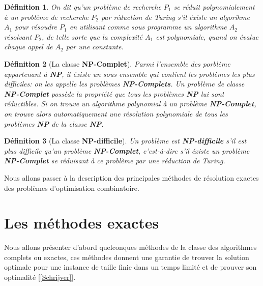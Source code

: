 \documentclass[a4paper,11pt,oneside]{report}
\theoremstyle{plain}
\newtheorem{definition}{D\'efinition}[section]
\newcommand{\0}{/ \! \! \! 0}
\theoremstyle{plain}
\begin{document}
\begin{definition}
 On dit qu'un probl\`eme de recherche $P_1$ se r\'eduit polynomialement \`a un probl\`eme de recherche $P_2$ par r\'eduction de Turing s'il \'existe
  un algorihme $A_1$ pour r\'esoudre $P_1$ en utilisant comme sous programme un algorithme $A_2$ r\'esolvant $P_2$, de telle sorte que la complexit\'e
  $A_1$ est polynomiale, quand on \'evalue chaque appel de $A_2$ par une constante.
\end{definition}
\begin{definition}[La classe {\bf NP-Complet}]
 Parmi l'ensemble des porbl\`eme appartenant \`a {\bf NP}, il \'existe un sous ensemble qui contient les probl\`emes les plus difficiles: 
 on les appelle les probl\`emes {\bf NP-Complets}. Un probl\`eme de classe {\bf NP-Complet} poss\`ede la propri\'et\'e que tous les probl\`emes {\bf NP} lui
 sont r\'eductibles. Si on trouve un algorithme polynomial \`a un probl\`eme {\bf NP-Complet}, on trouve alors automatiquement une r\'esolution polynomiale
  de tous les probl\`emes {\bf NP} de la classe {\bf NP}.
\end{definition}
\begin{definition}[La classe {\bf NP-difficile}]
 Un probl\`eme est {\bf NP-difficile} s'il est plus difficile qu'un probl\`eme {\bf NP-Complet}, c'est-\`a-dire 
 s'il \'existe un probl\`eme {\bf NP-Complet} se r\'eduisant \`a ce probl\`eme par une r\'eduction de Turing.
\end{definition}
Nous allons passer \`a la description des principales m\'ethodes de r\'esolution exactes des probl\`emes d'optimisation combinatoire.
\section{Les m\'ethodes exactes}
 Nous allons pr\'esenter d'abord quelconques m\'ethodes de la classe des algorithmes complets ou exactes, ces m\'ethodes donnent une garantie de trouver la
 solution optimale pour une instance de taille finie dans un temps limit\'e et de prouver son optimalit\'e [\ref{Schrijver}].
\end{document}
